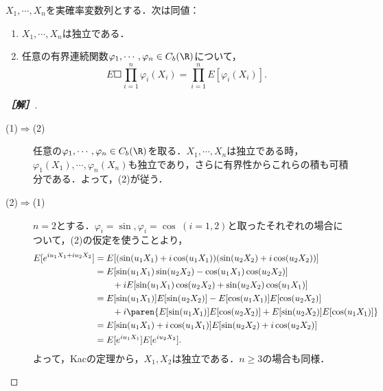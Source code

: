 \documentclass[uplatex,dvipdfmx]{jsarticle}
\begin{document}
\begin{problem*}[14]
    $X_1,\cdots,X_n$を実確率変数列とする．次は同値：
    \begin{enumerate}
        \item $X_1,\cdots,X_n$は独立である．
        \item 任意の有界連続関数$\varphi_1,\cdots,\varphi_n\in C_b(\R)$について，
        \[E\Square{\prod^n_{i=1}\varphi_i(X_i)}=\prod^n_{i=1}E[\varphi_i(X_i)].\]
    \end{enumerate}
\end{problem*}
\begin{proof}[\bf［解］]\mbox{}
    \begin{description}
        \item[(1)$\Rightarrow$(2)] 任意の$\varphi_1,\cdots,\varphi_n\in C_b(\R)$を取る．$X_1,\cdots,X_n$は独立である時，$\varphi_1(X_1),\cdots,\varphi_n(X_n)$も独立であり，さらに有界性からこれらの積も可積分である．よって，(2)が従う．
        \item[(2)$\Rightarrow$(1)] $n=2$とする．$\varphi_i=\sin,\varphi_i=\cos\;(i=1,2)$と取ったそれぞれの場合について，(2)の仮定を使うことより，
        \begin{align*}
            E[e^{iu_1X_1+iu_2X_2}]&=E[(\sin(u_1X_1)+i\cos(u_1X_1))(\sin(u_2X_2)+i\cos(u_2X_2))]\\
            &=E[\sin(u_1X_1)\sin(u_2X_2)-\cos(u_1X_1)\cos(u_2X_2)]\\
            &\qquad+iE[\sin(u_1X_1)\cos(u_2X_2)+\sin(u_2X_2)\cos(u_1X_1)]\\
            &=E[\sin(u_1X_1)]E[\sin(u_2X_2)]-E[\cos(u_1X_1)]E[\cos(u_2X_2)]\\
            &\qquad+i\paren{E[\sin(u_1X_1)]E[\cos(u_2X_2)]+E[\sin(u_2X_2)]E[\cos(u_1X_1)]}\\
            &=E[\sin(u_1X_1)+i\cos(u_1X_1)]E[\sin(u_2X_2)+i\cos(u_2X_2)]\\
            &=E[e^{iu_1X_1}]E[e^{iu_2X_2}].
        \end{align*}
        よって，Kacの定理から，$X_1,X_2$は独立である．$n\ge3$の場合も同様．
    \end{description}
\end{proof}
\end{document}
